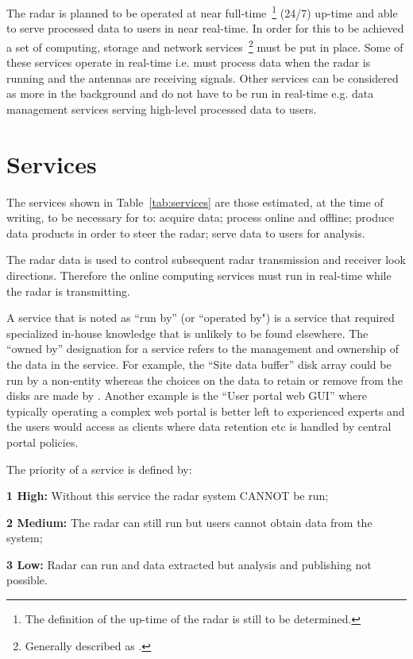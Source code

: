 \documentclass[12pt,a4paper]{article}
\begin{document}
The \ED radar is planned to be operated at near full-time~\footnote{The definition of the up-time of the \ED radar is still to be determined.} (24/7) up-time and able to serve processed data to users in near real-time.
In order for this to be achieved a set of computing, storage and network services~\footnote{Generally described as \einfra.} must be put in place.
Some of these \einfra services operate in real-time i.e. must process data when the radar is running and the antennas are receiving signals.
Other \einfra services can be considered as more in the background and
do not have to be run in real-time e.g. data management services serving high-level processed data to \ED users.

\section{\ED \einfra Services}

The services shown in Table~\ref{tab:services} are those estimated, at the time of writing, to be necessary for \ED to: acquire data; process online and offline; produce data products in order to steer the radar; serve data to users for analysis.
\newlength{\mycolwidth}
\setlength{\mycolwidth}{3.0cm}


The radar data is used to control subsequent radar transmission and receiver look directions.
Therefore the online computing services must run in real-time while the radar is transmitting.

A service that is noted as ``run by'' (or ``operated by") \EC is a service that required specialized in-house knowledge that is unlikely to be found elsewhere.
The ``owned by'' designation for a service refers to the management and ownership of the data in the service.
For example, the ``Site data buffer'' disk array could be run by a non-\EC entity whereas the choices on the data to retain or remove from the disks are made by \EC.
Another example is the ``User portal web GUI'' where typically operating a complex web portal is better left to experienced experts and the \EC users would access as clients where data retention etc is handled by central portal policies.

The priority of a service is defined by:
\bitm
\item {\bf 1 High:} Without this service the radar system CANNOT be run; \item {\bf 2 Medium:} The radar can still run but users cannot obtain data from the system; 
\item{\bf 3 Low:} Radar can run and data extracted but analysis and publishing not possible.
\eitm
\end{document}
